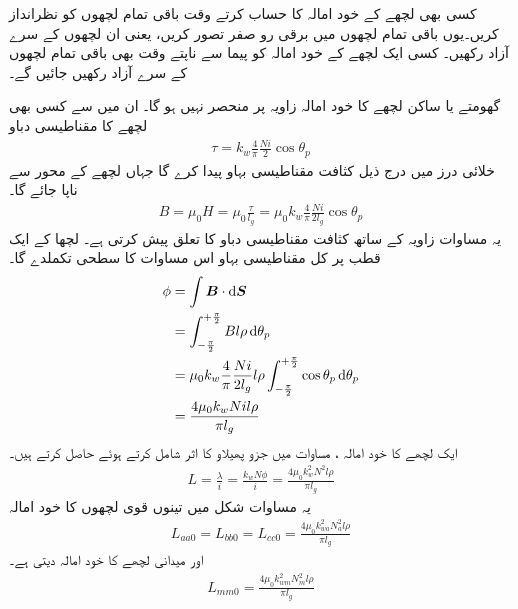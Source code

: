 کسی بھی لچھے کے خود امالہ کا حساب کرتے وقت باقی تمام لچھوں کو نظرانداز کریں۔یوں  باقی تمام لچھوں میں برقی رو صفر تصور کریں، یعنی ان لچھوں  کے سرے آزاد رکھیں۔ کسی ایک لچھے کے خود امالہ کو پیما سے ناپتے وقت بھی باقی تمام لچھوں کے سرے آزاد رکھیں جائیں گے۔ 


گھومتے یا ساکن لچھے کا خود امالہ  زاویہ  پر منحصر نہیں ہو گا۔ ان میں سے کسی بھی لچھے کا مقناطیسی دباو  
\begin{align}
\tau=k_w \frac{4}{\pi}\frac{N i}{2} \cos \theta_p
\end{align}
خلائی درز میں درج ذیل  کثافت مقناطیسی بہاو   پیدا کرے گا جہاں  لچھے کے محور سے ناپا جائے گا۔	
\begin{align}
B=\mu_0 H=\mu_0 \frac{\tau}{l_g}=\mu_0 k_w \frac{4}{\pi}\frac{N i}{2 l_g} \cos \theta_p
\end{align}
یہ مساوات زاویہ  کے ساتھ  کثافت مقناطیسی دباو  کا تعلق پیش کرتی ہے۔ لچھا کے ایک قطب پر  کل مقناطیسی بہاو   اس مساوات کا سطحی تکملدے گا۔
\begin{gather}
\begin{aligned}\label{مساوات_معاصر_بہاو_بذریع_سطحی_تکمل}
\phi&=\int \kvec{B} \cdot \dif \kvec{S}\\
&=\int_{-\frac{\pi}{2}}^{+\frac{\pi}{2}} B l \rho \dif \theta_p\\
&=\mu_0 k_w \frac{4}{\pi}\frac{N i}{2 l_g} l \rho \int_{-\frac{\pi}{2}}^{+\frac{\pi}{2}}  \cos  \theta_p \dif \theta_p\\
&=\frac{4 \mu_0 k_w N i l \rho}{\pi l_g}
\end{aligned}
\end{gather}
ایک  لچھے کا خود امالہ ،  مساوات  میں جزو پھیلاو  کا اثر  شامل کرتے ہوئے  حاصل کرتے ہیں۔
\begin{align}
L=\frac{\lambda}{i}=\frac{k_w N \phi}{i}=\frac{4 \mu_0 k_w^2 N^2  l \rho}{\pi l_g}
\end{align}
یہ مساوات شکل  میں تینوں قوی لچھوں کا خود امالہ
\begin{align}\label{مساوات_معاصر_تین_ساکن_امالہ_برابر}
L_{aa0}=L_{bb0}=L_{cc0}=\frac{4 \mu_0 k_{wa}^2 N_a^2  l \rho}{\pi l_g}
\end{align}
اور  میدانی لچھے کا خود امالہ دیتی ہے۔
\begin{align}
L_{mm0}=\frac{4 \mu_0 k_{wm}^2 N_m^2  l \rho}{\pi l_g}
\end{align}

